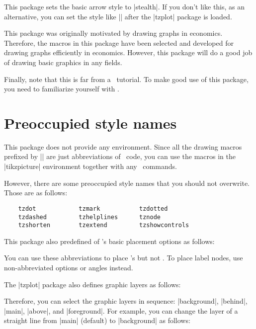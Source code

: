 This package sets the basic arrow style to |stealth|.
If you don't like this, as an alternative, you can set the style like |\tikzset{>=to}| after the |tzplot| package is loaded.

This package was originally motivated by drawing graphs in economics.
Therefore, the macros in this package have been selected and developed for drawing graphs efficiently in economics. However, this package will do a good job of drawing basic graphics in any fields.

Finally, note that this is far from a \Tikz\ tutorial.
To make good use of this package, you need to familiarize yourself with \Tikz.

\section{Preoccupied style names}
\label{s:stylenames}

This package does not provide any environment.
Since all the drawing macros prefixed by |\tz| are just abbreviations of \Tikz\ code,
you can use the macros in the |tikzpicture| environment together with any \Tikz\ commands.

However, there are some preoccupied style names that you should not overwrite.
Those are as follows:

\begin{verbatim}
    tzdot            tzmark           tzdotted
    tzdashed         tzhelplines      tznode
    tzshorten        tzextend         tzshowcontrols
\end{verbatim}

This package also predefined  of \Tikz's basic placement options as follows:
\label{abbreviations}

\begin{tzsty}{}
\end{tzsty}
You can use these abbreviations to place \Tikz's  but not . To place label nodes, use non-abbreviated options or angles instead.


The |tzplot| package also defines graphic layers as follows:

\begin{tzsty}{}

\end{tzsty}
Therefore, you can select the graphic layers in sequence: |background|, |behind|, |main|, |above|, and |foreground|.
For example, you can change the layer of a straight line from |main| (default) to |background| as follows:

